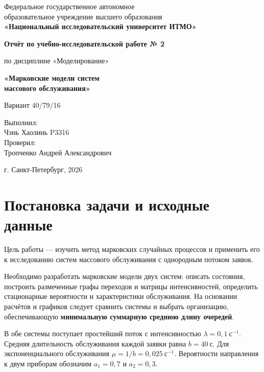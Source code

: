 \documentclass[11pt,a4paper]{article}
\newcommand{\secs}{\text{с}}
\begin{document}
\hypersetup{pageanchor=false}
\begin{titlepage}
\centering
Федеральное государственное автономное\\
образовательное учреждение высшего образования\\
\textbf{«Национальный исследовательский университет ИТМО»}
\vfill
{\Large\bfseries Отчёт по учебно-исследовательской работе № 2\par}
\vspace{0.7\baselineskip}
по дисциплине «Моделирование»\\[0.7\baselineskip]
{\large\bfseries «Марковские модели систем\\массового обслуживания»\par}
\vspace{0.7\baselineskip}
Вариант 40/79/16
\vfill
\begin{flushright}
Выполнил:\\
Чэнь Хаолинь P3316\\[1\baselineskip]
Проверил:\\
Тропченко Андрей Александрович
\end{flushright}
\vfill
г. Санкт-Петербург, 2026
\end{titlepage}
\hypersetup{pageanchor=true}
\tableofcontents
\newpage
{}

\section{Постановка задачи и исходные данные}
Цель работы --- изучить метод марковских случайных процессов и применить его к исследованию систем массового обслуживания с однородным потоком заявок.

Необходимо разработать марковские модели двух систем: описать состояния, построить размеченные графы переходов и матрицы интенсивностей, определить стационарные вероятности и характеристики обслуживания. На основании расчётов и графиков следует сравнить системы и выбрать организацию, обеспечивающую \textbf{минимальную суммарную среднюю длину очередей}.

В обе системы поступает простейший поток с интенсивностью $\lambda=0{,}1\ \secs^{-1}$. Средняя длительность обслуживания каждой заявки равна $b=40\ \secs$. Для экспоненциального обслуживания $\mu=1/b=0{,}025\ \secs^{-1}$. Вероятности направления к двум приборам обозначим $a_1=0{,}7$ и $a_2=0{,}3$.
\end{document}
